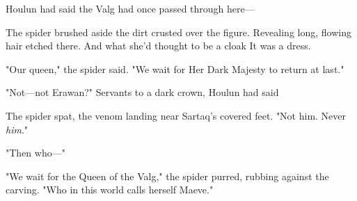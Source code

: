 Houlun had said the Valg had once passed through here---

The spider brushed aside the dirt crusted over the figure. Revealing long, flowing hair etched there. And what she'd thought to be a cloak
 It was a dress.

"Our queen," the spider said. "We wait for Her Dark Majesty to return at last."

"Not---not Erawan?" Servants to a dark crown, Houlun had said 

The spider spat, the venom landing near Sartaq's covered feet. "Not him. Never \emph{him}."

"Then who---"

"We wait for the Queen of the Valg," the spider purred, rubbing against the carving. "Who in this world calls herself Maeve."

